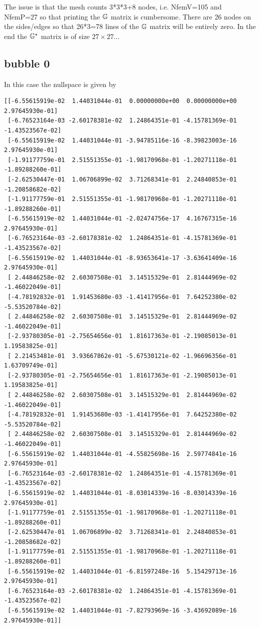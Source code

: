 The issue is that the mesh counts 3*3*3+8 nodes, i.e. NfemV=105 and 
NfemP=27 so that printing the ${\mathbb{G}}$ matrix is cumbersome. 
There are 26 nodes on the sides/edges so that 26*3=78 lines
of the ${\mathbb{G}}$ matrix will be entirely zero. In the end 
the ${\mathbb{G}}^\star$ matrix is of size $27\times 27$... 

\subsection*{bubble 0}

In this case the nullspace is given by
\begin{tiny}
\begin{verbatim}
[[-6.55615919e-02  1.44031044e-01  0.00000000e+00  0.00000000e+00  2.97645930e-01]
 [-6.76523164e-03 -2.60178381e-02  1.24864351e-01 -4.15781369e-01 -1.43523567e-02]
 [-6.55615919e-02  1.44031044e-01 -3.94785116e-16 -8.39823003e-16  2.97645930e-01]
 [-1.91177759e-01  2.51551355e-01 -1.98170968e-01 -1.20271118e-01 -1.89288260e-01]
 [-2.62530447e-01  1.06706899e-02  3.71268341e-01  2.24840853e-01 -1.20858682e-02]
 [-1.91177759e-01  2.51551355e-01 -1.98170968e-01 -1.20271118e-01 -1.89288260e-01]
 [-6.55615919e-02  1.44031044e-01 -2.02474756e-17  4.16767315e-16  2.97645930e-01]
 [-6.76523164e-03 -2.60178381e-02  1.24864351e-01 -4.15781369e-01 -1.43523567e-02]
 [-6.55615919e-02  1.44031044e-01 -8.93653641e-17 -3.63641409e-16  2.97645930e-01]
 [ 2.44846258e-02  2.60307508e-01  3.14515329e-01  2.81444969e-02 -1.46022049e-01]
 [-4.78192832e-01  1.91453680e-03 -1.41417956e-01  7.64252380e-02 -5.53520784e-02]
 [ 2.44846258e-02  2.60307508e-01  3.14515329e-01  2.81444969e-02 -1.46022049e-01]
 [-2.93780305e-01 -2.75654656e-01  1.81617363e-01 -2.19085013e-01  1.19583825e-01]
 [ 2.21453481e-01  3.93667862e-01 -5.67530121e-02 -1.96696356e-01  1.63709749e-01]
 [-2.93780305e-01 -2.75654656e-01  1.81617363e-01 -2.19085013e-01  1.19583825e-01]
 [ 2.44846258e-02  2.60307508e-01  3.14515329e-01  2.81444969e-02 -1.46022049e-01]
 [-4.78192832e-01  1.91453680e-03 -1.41417956e-01  7.64252380e-02 -5.53520784e-02]
 [ 2.44846258e-02  2.60307508e-01  3.14515329e-01  2.81444969e-02 -1.46022049e-01]
 [-6.55615919e-02  1.44031044e-01 -4.55825698e-16  2.59774841e-16  2.97645930e-01]
 [-6.76523164e-03 -2.60178381e-02  1.24864351e-01 -4.15781369e-01 -1.43523567e-02]
 [-6.55615919e-02  1.44031044e-01 -8.03014339e-16 -8.03014339e-16  2.97645930e-01]
 [-1.91177759e-01  2.51551355e-01 -1.98170968e-01 -1.20271118e-01 -1.89288260e-01]
 [-2.62530447e-01  1.06706899e-02  3.71268341e-01  2.24840853e-01 -1.20858682e-02]
 [-1.91177759e-01  2.51551355e-01 -1.98170968e-01 -1.20271118e-01 -1.89288260e-01]
 [-6.55615919e-02  1.44031044e-01 -6.81597248e-16  5.15429713e-16  2.97645930e-01]
 [-6.76523164e-03 -2.60178381e-02  1.24864351e-01 -4.15781369e-01 -1.43523567e-02]
 [-6.55615919e-02  1.44031044e-01 -7.82793969e-16 -3.43692089e-16  2.97645930e-01]]
\end{verbatim}
\end{tiny}

